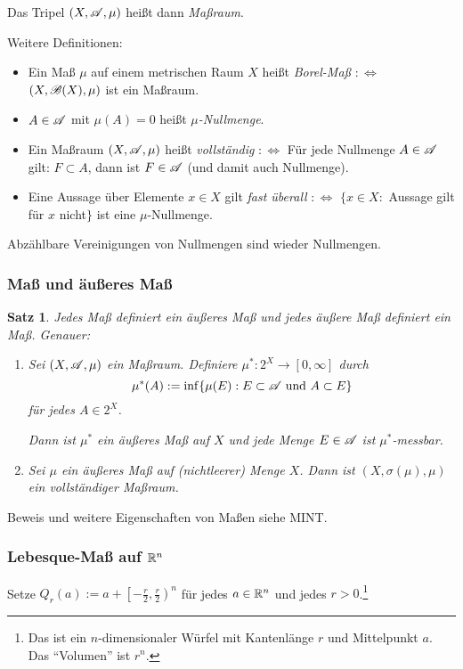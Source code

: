 \documentclass[
 a4paper,
 12pt,
 parskip=half
 ]{scrartcl}
\theoremstyle{plain}
\newtheorem*{thm*}{Satz}
\theoremstyle{definition}
\numberwithin{equation}{section}
\begin{document}
Das Tripel $(X, \mathscr{A}, \mu)$ heißt dann \emph{Maßraum}.

Weitere Definitionen:
\begin{itemize}
 \item Ein Maß $\mu$ auf einem metrischen Raum $X$ heißt \emph{Borel-Maß} $:\Leftrightarrow$ $(X, \mathscr{B}(X), \mu)$ ist ein Maßraum.
 \item $A \in \mathscr{A}$ mit $\mu(A) = 0$ heißt \emph{$\mu$-Nullmenge}.
 \item Ein Maßraum $(X, \mathscr{A}, \mu)$ heißt \emph{vollständig} $:\Leftrightarrow$ Für jede Nullmenge $A \in \mathscr{A}$ gilt: $F \subset A$, dann ist $F \in \mathscr{A}$ (und damit auch Nullmenge).
 \item Eine Aussage über Elemente $x \in X$ gilt \emph{fast überall} $:\Leftrightarrow$
 $\{ x \in X :$  Aussage gilt für  $x$ nicht$\}$
 ist eine $\mu$-Nullmenge.
\end{itemize}

\begin{bem}
 Abzählbare Vereinigungen von Nullmengen sind wieder Nullmengen.
\end{bem}

\subsubsection{Maß und äußeres Maß}
\begin{thm*}
 Jedes Maß definiert ein äußeres Maß und jedes äußere Maß definiert ein Maß. Genauer:
 \begin{enumerate}
  \item Sei $(X,\mathscr{A},\mu)$ ein Maßraum. Definiere $\mu^\ast:2^X \to [0,\infty]$ durch
  \[ \mu^\ast(A) := \inf \{ \mu(E) : E \subset \mathscr{A} \text{ und } A \subset E \} \]
  für jedes $A \in 2^X$.
  
  Dann ist $\mu^\ast$ ein äußeres Maß auf $X$ und jede Menge $E \in \mathscr{A}$ ist $\mu^\ast$-messbar.
  \item Sei $\mu$ ein äußeres Maß auf (nichtleerer) Menge $X$. Dann ist $(X, \sigma(\mu), \mu)$ ein voll\-ständiger Maßraum.
 \end{enumerate}
\end{thm*}

Beweis und weitere Eigenschaften von Maßen siehe MINT.

\subsubsection{Lebesque-Maß auf \texorpdfstring{$\mathbb{R}^n$}{Rn}}
Setze $Q_r(a) := a + \left[ - \frac{r}{2}, \frac{r}{2} \right)^n$ für jedes $a \in \mathbb{R}^n$ und jedes $r > 0$.\footnote{Das ist ein $n$-dimensionaler Würfel mit Kantenlänge $r$ und Mittelpunkt $a$. Das ``Volumen'' ist $r^n$.}
\end{document}
